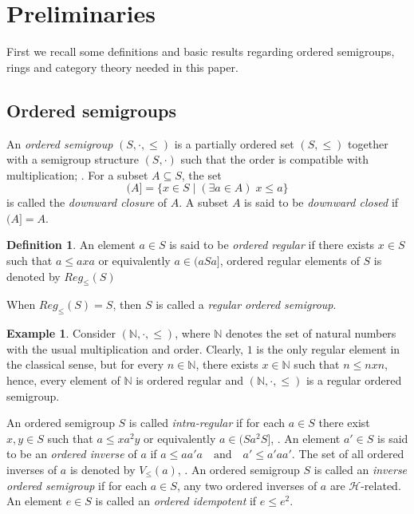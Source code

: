 \documentclass[12pt,a4paper]{amsart}
\theoremstyle{plain}
\theoremstyle{definition}
\newtheorem{definition}[theorem]{Definition}
\newtheorem{example}[theorem]{Example}
\begin{document}
\section{Preliminaries}
First we recall some definitions and basic results regarding ordered semigroups, rings and category theory needed in this paper.
\subsection{Ordered semigroups}

An \textit{ordered semigroup}  $(S,\cdot,\leq)$ is a partially ordered set $(S,\leq)$ together with a semigroup structure $(S,\cdot)$ such that the order is compatible with multiplication; \cite{txtbk}. 
For a subset $A \subseteq S$, the set
\[
(A] = \{x \in S \mid (\exists a \in A)\; x \leq a\}
\]
is called the \textit{downward closure} of $A$. A subset $A$ is said to be \textit{downward closed} if $(A] = A$.

\begin{definition}\cite{keharegularity}
	An element $a \in S$ is said to be \textit{ordered regular} if there exists $x \in S$ such that
	$a \leq axa$ or equivalently $a \in (aSa]$, ordered regular elements of $S$ is denoted by $Reg_{\leq}(S)$
\end{definition}
When $Reg_{\leq}(S)=S$, then $S$ is called a \textit{regular ordered semigroup}.
\begin{example}
Consider $(\mathbb{N},\cdot,\leq)$, where $\mathbb{N}$ denotes the set of natural numbers with the usual multiplication and order. Clearly, $1$ is the only regular element in the classical sense, but for every $n \in \mathbb{N}$, there exists $x \in \mathbb{N}$ such that $n \leq nxn$, hence, every element of $\mathbb{N}$ is ordered regular and $(\mathbb{N},\cdot,\leq)$ is a regular ordered semigroup.
\end{example}

An ordered semigroup $S$ is called \textit{intra-regular}  if for each $a \in S$ there exist $x,y \in S$ such that
$a \leq xa^{2}y$
or equivalently $a \in (Sa^{2}S]$, \cite{intrregular}.
An element $a' \in S$ is said to be an \textit{ordered inverse}  of $a$ if
$a \leq aa'a \quad \text{and} \quad a' \leq a'aa'.$
The set of all ordered inverses of $a$ is denoted by $V_{\leq}(a)$, \cite{jamadar}.
An ordered semigroup $S$ is called an \textit{inverse ordered semigroup} if for each $a \in S$, any two ordered inverses of $a$ are $\mathcal{H}$-related.
An element $e \in S$ is called an \textit{ordered idempotent} if $e \leq e^{2}$.
\end{document}
